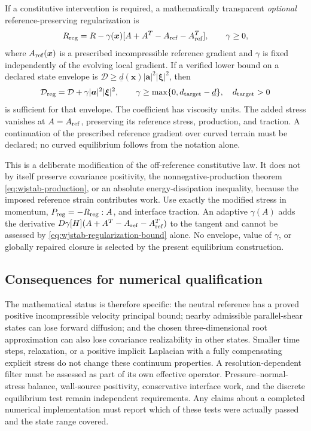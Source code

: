 \documentclass[11pt,a4paper]{article}
\numberwithin{equation}{section}
\begin{document}
If a constitutive intervention is required, a mathematically transparent
\emph{optional} reference-preserving regularization is
\begin{equation}
 R_{\rm reg}=R-\gamma(\boldsymbol x)
       [A+A^T-A_{\rm ref}-A_{\rm ref}^T],\qquad\gamma\geq0,
 \label{eq:wjstab-optional-regularization}
\end{equation}
where $A_{\rm ref}(\boldsymbol x)$ is a prescribed incompressible
reference gradient and $\gamma$ is fixed independently of the evolving
local gradient. If a verified lower bound on a declared state envelope
is $\mathcal D\geq\underline d(\boldsymbol x)
|\boldsymbol a|^2|\boldsymbol\xi|^2$, then
\begin{equation}
 \mathcal D_{\rm reg}=\mathcal D+
           \gamma|\boldsymbol a|^2|\boldsymbol\xi|^2,
 \qquad
 \gamma\geq\max\{0,d_{\rm target}-\underline d\},
 \quad d_{\rm target}>0
 \label{eq:wjstab-regularization-bound}
\end{equation}
is sufficient for that envelope. The coefficient has viscosity units.
The added stress vanishes at $A=A_{\rm ref}$, preserving its reference
stress, production, and traction. A continuation of the prescribed
reference gradient over curved terrain must be declared; no curved
equilibrium follows from the notation alone.

This is a deliberate modification of the off-reference constitutive
law. It does not by itself preserve covariance positivity, the
nonnegative-production theorem \eqref{eq:wjstab-production}, or an
absolute energy-dissipation inequality, because the imposed reference
strain contributes work. Use exactly the modified stress in momentum,
$P_{\rm reg}=-R_{\rm reg}:A$, and interface traction. An adaptive
$\gamma(A)$ adds the derivative
$D\gamma[H](A+A^T-A_{\rm ref}-A_{\rm ref}^T)$ to the tangent and
cannot be assessed by \eqref{eq:wjstab-regularization-bound} alone.
No envelope, value of $\gamma$, or globally repaired closure is selected
by the present equilibrium construction.

\subsection{Consequences for numerical qualification}

The mathematical status is therefore specific: the neutral reference
has a proved positive incompressible velocity principal bound; nearby
admissible parallel-shear states can lose forward diffusion; and the
chosen three-dimensional root approximation can also lose covariance
realizability in other states. Smaller time steps, relaxation, or a
positive implicit Laplacian with a fully compensating explicit stress
do not change these continuum properties. A resolution-dependent
filter must be assessed as part of its own effective operator.
Pressure--normal-stress balance, wall-source positivity, conservative
interface work, and the discrete equilibrium test remain independent
requirements. Any claims about a completed numerical implementation
must report which of these tests were actually passed and the state
range covered.
\end{document}
